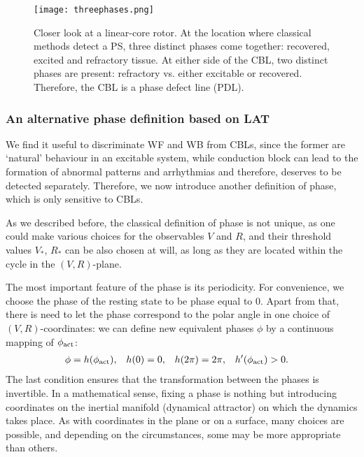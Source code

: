 \documentclass{article}
\newcommand{\phiact}{\ensuremath{\phi_{\rm act}}}
\newcommand{\VS}{V_*}
\newcommand{\RS}{R_*}
\begin{document}
 \begin{figure}
     \centering
     \texttt{[image: threephases.png]}
     \caption{Closer look at a linear-core rotor. At the location where classical methods detect a PS, three distinct phases come together: recovered, excited and refractory tissue. At either side of the CBL, two distinct phases are present: refractory vs. either excitable or recovered. Therefore, the CBL is a phase defect line (PDL).}
     \label{fig:phasediagram}
 \end{figure}


\subsubsection{An alternative phase definition based on LAT}


We find it useful to discriminate WF and WB from CBLs, since the former are `natural' behaviour in an excitable system, while conduction block can lead to the formation of abnormal patterns and arrhythmias and therefore, deserves to be detected separately. Therefore, we now introduce another definition of phase, which is only sensitive to CBLs.

As we described before, the classical definition of phase is not unique, as one could make various choices for the observables $V$ and $R$, and their threshold values $\VS$, $\RS$ can be also chosen at will, as long as they are located within the cycle in the $(V,R)$-plane. 

The most important feature of the phase is its periodicity. For convenience, we choose the phase of the resting state to be phase equal to $0$. Apart from that, there is need to let the phase correspond to the polar angle in one choice of $(V,R)$-coordinates: we can define new equivalent phases $\phi$ by a continuous mapping of $\phiact$: 
\begin{align}
    \phi &= h(\phiact), & h(0) &= 0, & h(2\pi) &=2\pi, & h'(\phiact) &>0.
\end{align}
The last condition ensures that the transformation between the phases is invertible. In a mathematical sense, fixing a phase is nothing but introducing coordinates on the inertial manifold (dynamical attractor) on which the dynamics takes place. As with coordinates in the plane or on a surface, many choices are possible, and depending on the circumstances, some may be more appropriate than others. 
\end{document}

